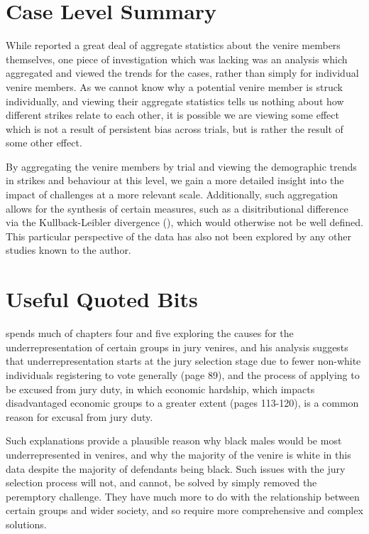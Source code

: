 \section{Case Level Summary} \label{sec:casesum}

While \cite{JurySunshineProj} reported a great deal of aggregate statistics about the venire members themselves, one piece of
investigation which was lacking was an analysis which aggregated and viewed the trends for the cases, rather than simply for
individual venire members. As we cannot know why a potential venire member is struck individually, and viewing their aggregate
statistics tells us nothing about how different strikes relate to each other, it is possible we are viewing some effect which is
not a result of persistent bias across trials, but is rather the result of some other effect.

By aggregating the venire members by trial and viewing the demographic trends in strikes and behaviour at this level, we gain a
more detailed insight into the impact of challenges at a more relevant scale. Additionally, such aggregation allows for the
synthesis of certain measures, such as a disitributional difference via the Kullback-Leibler divergence (\cite{kullback1951}),
which would otherwise not be well defined. This particular perspective of the data has also not been explored by any other studies
known to the author.

\section{Useful Quoted Bits}

\cite{vandykejurysel} spends much of chapters four and five exploring the causes for the underrepresentation of certain groups in
jury venires, and his analysis suggests that underrepresentation starts at the jury selection stage due to fewer non-white
individuals registering to vote generally (page 89), and the process of applying to be excused from jury duty, in which economic
hardship, which impacts disadvantaged economic groups to a greater extent (pages 113-120), is a common reason for excusal from
jury duty.

Such explanations provide a plausible reason why black males would be most underrepresented in venires, and why the majority of
the venire is white in this data despite the majority of defendants being black. Such issues with the jury selection process will
not, and cannot, be solved by simply removed the peremptory challenge. They have much more to do with the relationship between
certain groups and wider society, and so require more comprehensive and complex solutions.